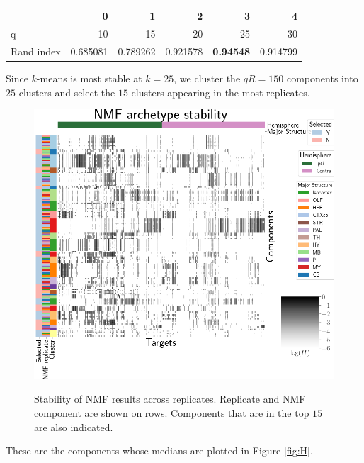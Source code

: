 \begin{table}[H]
\begin{tabular}{lrrrrr}
\toprule
{} &          0 &          1 &          2 &         3 &          4 \\
\midrule
q          &  10 &  15 &  20 &  25 &  30 \\
Rand index &   0.685081 &   0.789262 &   0.921578 &   \textbf{0.94548} &   0.914799 \\
\bottomrule
\end{tabular}
\end{table}

Since $k$-means is most stable at $k=25$, we cluster the $qR = 150$ components into $25$ clusters and select the $15$ clusters appearing in the most replicates.
\begin{figure}[H]
    \centering
    \includegraphics[width = 5in]{figs/nmfcluster.png} 
    \label{fig:distances}
    \caption{Stability of NMF results across replicates. 
    Replicate and NMF component are shown on rows.
    Components that are in the top $15$ are also indicated.}
\end{figure}
These are the components whose medians are plotted in Figure \ref{fig:H}.

\newpage




